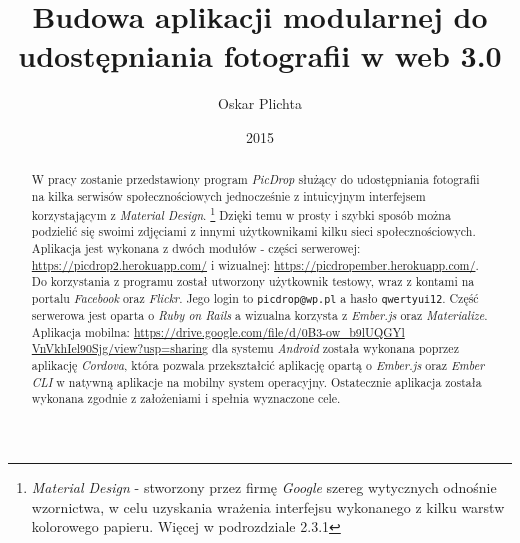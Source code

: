 \documentclass[openright]{xmgr}
\author   {Oskar Plichta}
\title    {Budowa aplikacji modularnej do udostępniania fotografii  w web 3.0}
\date     {2015}
\begin{document}
\begin{abstract}
W pracy zostanie przedstawiony program \textit{PicDrop} służący do udostępniania fotografii na kilka serwisów społecznościowych jednocześnie z intuicyjnym interfejsem korzystającym z \textit{Material Design}. \footnote{\textit{Material Design} - stworzony przez firmę \textit{ Google} szereg wytycznych odnośnie wzornictwa, w celu uzyskania wrażenia interfejsu wykonanego z kilku warstw kolorowego papieru. Więcej w podrozdziale 2.3.1} Dzięki temu w prosty i szybki sposób można podzielić się swoimi zdjęciami z innymi użytkownikami kilku sieci społecznościowych. Aplikacja jest wykonana z dwóch modułów - części serwerowej: \href{https://picdrop2.herokuapp.com/}{https://picdrop2.herokuapp.com/} i wizualnej: \href{https://picdropember.herokuapp.com/}{ https://picdropember.herokuapp.com/}. Do korzystania z programu został utworzony użytkownik testowy, wraz z kontami na portalu \textit{Facebook} oraz \textit{Flickr}. Jego login to \verb|picdrop@wp.pl| a hasło \verb|qwertyui12|.  Część serwerowa jest oparta o \textit{Ruby on Rails} a wizualna korzysta z \textit{Ember.js} oraz \textit{Materialize}. Aplikacja mobilna: \href{https://drive.google.com/file/d/0B3-ow_b9lUQGYlVnVkhIel90Sjg/view?usp=sharing}{https://drive.google.com/file/d/0B3-ow\_b9lUQGYl VnVkhIel90Sjg/view?usp=sharing} dla systemu \textit{Android}  została wykonana poprzez aplikację \textit{Cordova}, która pozwala przekształcić aplikację opartą o \textit{Ember.js} oraz \textit{Ember CLI} w natywną aplikacje na mobilny system operacyjny. Ostatecznie aplikacja została wykonana zgodnie z założeniami i spełnia wyznaczone cele.

\end{abstract}
\end{document}
